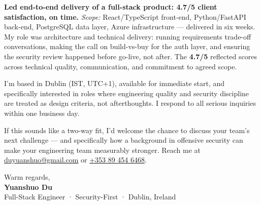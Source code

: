 \documentclass{coverletter}
\begin{document}
{  \vspace{0.12cm}

  \textbf{Led end-to-end delivery of a full-stack product: \textbf{4.7/5 client satisfaction}, on time.}
  \textit{Scope:} React/TypeScript front-end, Python/FastAPI back-end, PostgreSQL
  data layer, Azure infrastructure — delivered in six weeks. My role was architecture
  and technical delivery: running requirements trade-off conversations,
  making the call on build-vs-buy for the auth layer, and ensuring the security review
  happened before go-live, not after. The \textbf{4.7/5} reflected scores across
  technical quality, communication, and commitment to agreed scope.
}

\vspace{0.3cm}

\noindent%
{\color{secondary}\sffamily\small
     
    
    
    
    
}

\vspace{0.3cm}

\noindent%
{\color{secondary}\sffamily\small
  I'm based in Dublin (IST, UTC+1), available for immediate start, and specifically
  interested in roles where engineering quality and security discipline are treated
  as design criteria, not afterthoughts. I respond to all serious inquiries within
  one business day.

  If this sounds like a two-way fit, I'd welcome the chance to discuss your team's
  next challenge — and specifically how a background in offensive security can
  make your engineering team measurably stronger. Reach me at
  \href{https://mail.google.com/mail/?view=cm&to=duyuanshuo@gmail.com}{\color{accent}duyuanshuo@gmail.com}
  or \href{tel:+353894546468}{\color{accent}+353 89 454 6468}.
}

\vspace{0.3cm}

\noindent%
{\color{secondary}\sffamily\small Warm regards,}\\[0.25cm]
{\sffamily\bfseries\Large\color{namecolor} Yuanshuo Du}\\[0.05cm]
{\sffamily\small\color{muted} Full-Stack Engineer · Security-First · Dublin, Ireland}
\end{document}
